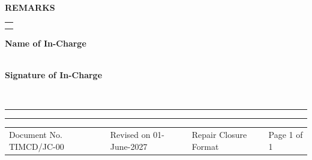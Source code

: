 \documentclass[a4paper,10pt]{article}
\newcommand{\sectiontitle}[1]{
\vspace{2mm}
\colorbox{sectiongray}{
\parbox{\dimexpr\linewidth-2\fboxsep}{
\textbf{\large #1}
}}
\vspace{1mm}
}
\begin{document}

\sectiontitle{REMARKS}

\begin{tabularx}{\textwidth}{|X|}
\hline

\\[20mm]

\\

\hline

\end{tabularx}

\vspace{5mm}

\begin{flushright}

\textbf{Name of In-Charge}

\\[8mm]

\textbf{Signature of In-Charge}

\\[8mm]

\rule{5cm}{0.4pt}

\end{flushright}

\vfill


\hrule
\vspace{2mm}

\footnotesize

\begin{tabularx}{\textwidth}{XXXX}
Document No. TIMCD/JC-00 &
Revised on 01-June-2027 &
Repair Closure Format &
Page 1 of 1
\end{tabularx}
\end{document}
